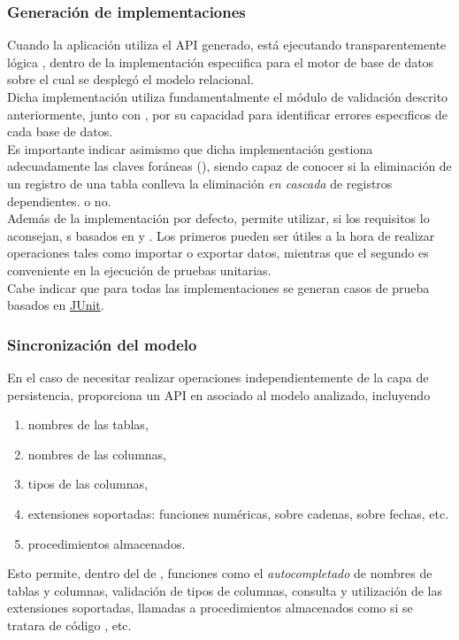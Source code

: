 \documentclass[dvips]{article}
\begin{document}
\subsubsection{Generaci\'on de implementaciones }
Cuando la aplicaci\'on utiliza el API generado,
est\'a ejecutando transparentemente l\'ogica , dentro de
la implementaci\'on espec\i{}ifica para el motor de base de datos
sobre el cual se despleg\'o el modelo relacional.\\
Dicha implementaci\'on utiliza fundamentalmente el m\'odulo de
validaci\'on descrito anteriormente, junto con , por su
capacidad para identificar errores espec\i{}ficos de cada base de
datos.\\
Es importante indicar asimismo que dicha implementaci\'on gestiona
adecuadamente las claves for\'aneas (), siendo
capaz de conocer si la eliminaci\'on de un registro de una tabla
conlleva la eliminaci\'on \textit{en cascada} de registros
dependientes. o no.\\
Adem\'as de la implementaci\'on por defecto, \queryj permite utilizar,
si los requisitos lo aconsejan, s basados en
 y . Los primeros pueden ser \'utiles a la
hora de realizar operaciones tales como importar o exportar datos,
mientras que el segundo es conveniente en la ejecuci\'on de pruebas
unitarias.\\
Cabe indicar que para todas las implementaciones se generan casos de
prueba basados en \href{http://www.junit.org}{JUnit}.
\subsubsection{Sincronizaci\'on del modelo}
En el caso de necesitar realizar operaciones 
independientemente de la capa de persistencia, \queryj proporciona un
API en  asociado al modelo analizado, incluyendo
\begin{enumerate}
  \item nombres de las tablas,
  \item nombres de las columnas,
  \item tipos de las columnas,
  \item extensiones  soportadas: funciones num\'ericas,
  sobre cadenas, sobre fechas, etc.
  \item procedimientos almacenados.
\end{enumerate}
Esto permite, dentro del  de , funciones como el
\textit{autocompletado} de nombres de tablas y columnas, validaci\'on
de tipos de columnas, consulta y utilizaci\'on de las extensiones
 soportadas, llamadas a procedimientos almacenados como
si se tratara de c\'odigo , etc.
\end{document}
